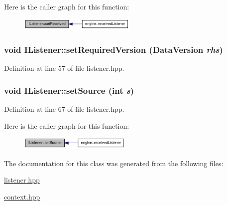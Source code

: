 Here is the caller graph for this function:\nopagebreak
\begin{figure}[H]
\begin{center}
\leavevmode
\includegraphics[width=159pt]{class_i_listener_a48b905974e451f8ab3998dd212d06af1_icgraph}
\end{center}
\end{figure}
\hypertarget{class_i_listener_aa2cf7948e5d24cded10e026fe202ab62}{
\subsubsection[{setRequiredVersion}]{\setlength{\rightskip}{0pt plus 5cm}void IListener::setRequiredVersion ({\bf DataVersion} {\em rhs})}}
\label{class_i_listener_aa2cf7948e5d24cded10e026fe202ab62}


Definition at line 57 of file listener.hpp.\hypertarget{class_i_listener_af65b43016d32d8437fc5dcc4ed11fef4}{
\subsubsection[{setSource}]{\setlength{\rightskip}{0pt plus 5cm}void IListener::setSource (int {\em s})}}
\label{class_i_listener_af65b43016d32d8437fc5dcc4ed11fef4}


Definition at line 67 of file listener.hpp.

Here is the caller graph for this function:\nopagebreak
\begin{figure}[H]
\begin{center}
\leavevmode
\includegraphics[width=153pt]{class_i_listener_af65b43016d32d8437fc5dcc4ed11fef4_icgraph}
\end{center}
\end{figure}


The documentation for this class was generated from the following files:\begin{DoxyCompactItemize}
\item 
\hyperlink{listener_8hpp}{listener.hpp}\item 
\hyperlink{context_8hpp}{context.hpp}\end{DoxyCompactItemize}
